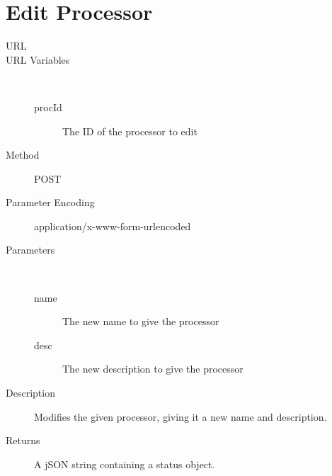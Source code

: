 \section{Edit Processor}
\begin{description}
\item [URL] 
\item [URL Variables] \
	\begin{description}
	\item [procId]  The ID of the processor to edit
	\end{description}
\item [Method] POST
\item [Parameter Encoding] application/x-www-form-urlencoded
\item [Parameters] \
	\begin{description}
	\item [name]  The new name to give the processor
	\item [desc]  The new description to give the processor
	\end{description}
\item [Description] Modifies the given processor, giving it a new name and description.
\item [Returns] A jSON string containing a status object.
\end{description}


